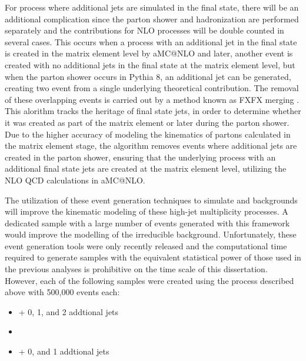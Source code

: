 \par For process where additional jets are simulated in the final
state, there will be an additional complication since the parton
shower and hadronization are performed separately and the
contributions for NLO processes will be double counted in several
cases.  This occurs when a process with an additional jet in the final
state is created in the matrix element level by aMC@NLO and later,
another event is created with no additional jets in the final state at
the matrix element level, but when the parton shower occurs in Pythia
8, an additional jet can be generated, creating two event from a
single underlying theoretical contribution.  The removal of these
overlapping events is carried out by a method known as FXFX
merging \cite{Frederix:2012ps}.  This alorithm tracks the heritage of
final state jets, in order to determine whether it was created as part
of the matrix element or later during the parton shower.  Due to the
higher accuracy of modeling the kinematics of partons calculated in
the matrix element stage, the algorithm removes events where
additional jets are created in the parton shower, ensuring that the
underlying process with an additional final state jets are created
at the matrix element level, utilizing the NLO QCD calculations in
aMC@NLO.  

\par The utilization of these event generation techniques to simulate
\ttH and \ttjets backgrounds will improve the kinematic modeling of
these high-jet multiplicity processes.  A dedicated \ttbb sample with
a large number of events generated with this framework would improve
the modelling of the irreducible background.  Unfortunately, these
event generation tools were only recently released and the
computational time required to generate samples with the equivalent
statistical power of those used in the previous analyses is
prohibitive on the time scale of this dissertation.  However, each of
the following samples were created using the process described above
with 500,000 events each: 

\begin{itemize}
  \item \ttbar + 0, 1, and 2 addtional jets
  \item \ttbb
  \item \ttH + 0, and 1 addtional jets
\end{itemize}

